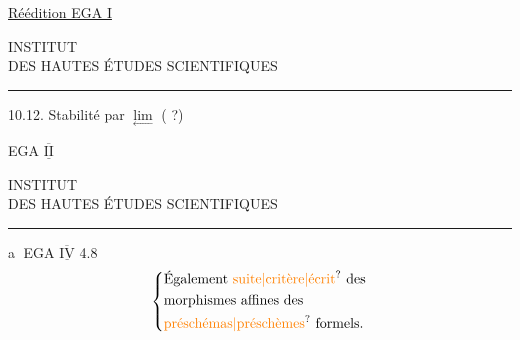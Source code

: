 
\begin{flushright}
\uline{Réédition EGA I}\\
\end{flushright}

\begin{center}
INSTITUT\\
DES HAUTES ÉTUDES SCIENTIFIQUES\\[-.3ex]
\rule{1.3cm}{.4pt}
\end{center}

10.12. Stabilité par $\underset{\longleftarrow}{\lim}$ ( ?)

\begin{flushright}
EGA $\underline{\overline{\mathrm{II}}}$
\end{flushright}

\begin{center}
INSTITUT\\
DES HAUTES ÉTUDES SCIENTIFIQUES\\[-.3ex]
\rule{1.3cm}{.4pt}
\end{center}

\textcircled{a} \quad {} EGA $\underline{\overline{\mathrm{IV}}}$ 4.8
\[
\left\{\begin{aligned}
&\text{Également \unsure{suite|critère|écrit} des}\\
&\text{morphismes affines des}\\
&\text{\unsure{préschémas|préschèmes} formels.}
\end{aligned}\right.
\]

